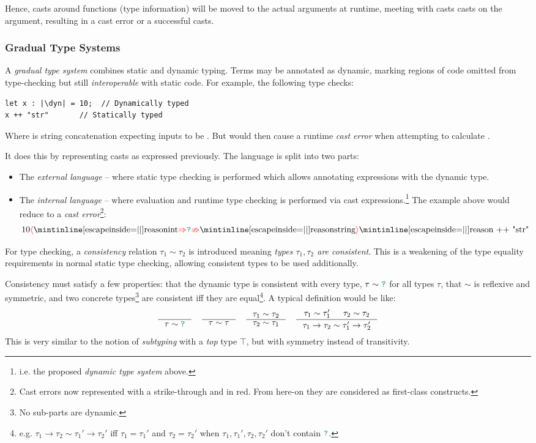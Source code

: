 Hence, casts around functions (type information) will be moved to the actual arguments at runtime, meeting with casts casts on the argument, resulting in a cast error or a successful casts.

\subsubsection{Gradual Type Systems}

A \textit{gradual type system} \cite{GradualRefined, GradualFunctional} combines static and dynamic typing. Terms may be annotated as dynamic, marking regions of code omitted from type-checking but still \textit{interoperable} with static code. For example, the following type checks:
\begin{verbatim}
let x : |\dyn| = 10;  // Dynamically typed
x ++ "str"       // Statically typed
\end{verbatim}
Where \code{++} is string concatenation expecting inputs to be . But would then cause a runtime \textit{cast error} when attempting to calculate .

It does this by representing casts as expressed previously. The language is split into two parts:
\begin{itemize}
\item The \textit{external language} -- where static type checking is performed which allows annotating expressions with the dynamic type.
\item The \textit{internal language} -- where evaluation and runtime type checking is performed via cast expressions.\footnote{i.e. the proposed \textit{dynamic type system} above.} The example above would reduce to a \textit{cast error}\footnote{Cast errors now represented with a strike-through and in red. From here-on they are considered as first-class constructs.}: \[10\scasterror{\code{int}}{\code{string}}\code{ ++ "str"}\]
\end{itemize}
For type checking, a \textit{consistency} relation $\tau_1 \sim \tau_2$ is introduced meaning \textit{types $\tau_1, \tau_2$ are consistent}. This is a weakening of the type equality requirements in normal static type checking, allowing consistent types to be used additionally.

Consistency must satisfy a few properties: that the dynamic type is consistent with every type, $\tau \sim {\color{teal}\texttt{?}}$ for all types $\tau$, that $\sim$ is reflexive and symmetric, and two concrete types\footnote{No sub-parts are dynamic.} are consistent iff they are equal\footnote{e.g. $\tau_1 \to \tau_2 \sim \tau_1' \to \tau_2'$ iff $\tau_1 = \tau_1'$ and $\tau_2 = \tau_2'$ when $\tau_1, \tau_1', \tau_2, \tau_2'$ don't contain ${\color{teal}\texttt{?}}$.}. A typical definition would be like:
\[\inference{}{\tau \sim \dyn} \quad \inference{}{\tau \sim \tau} \quad \inference{\tau_1 \sim \tau_2}{\tau_2 \sim \tau_1} \quad \inference{\tau_1 \sim \tau_1' & \tau_2 \sim \tau_2}{\tau_1 \to \tau_2 \sim \tau_1' \to \tau_2'}\]
This is very similar to the notion of \textit{subtyping} \cite[ch. 15]{TAPL} with a \textit{top} type $\top$, but with symmetry instead of transitivity.

